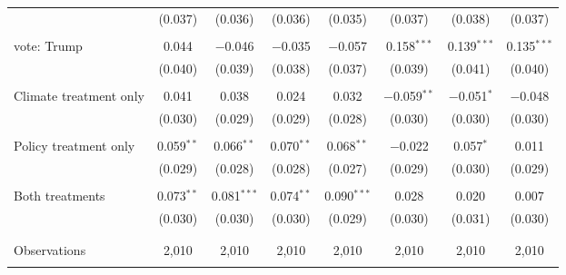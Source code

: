 \begin{tabular}{@{\extracolsep{5pt}}lccccccc}
  & (0.037) & (0.036) & (0.036) & (0.035) & (0.037) & (0.038) & (0.037) \\ 
  & & & & & & & \\ 
 vote: Trump & 0.044 & $-$0.046 & $-$0.035 & $-$0.057 & 0.158$^{***}$ & 0.139$^{***}$ & 0.135$^{***}$ \\ 
  & (0.040) & (0.039) & (0.038) & (0.037) & (0.039) & (0.041) & (0.040) \\ 
  & & & & & & & \\ 
 Climate treatment only & 0.041 & 0.038 & 0.024 & 0.032 & $-$0.059$^{**}$ & $-$0.051$^{*}$ & $-$0.048 \\ 
  & (0.030) & (0.029) & (0.029) & (0.028) & (0.030) & (0.030) & (0.030) \\ 
  & & & & & & & \\ 
 Policy treatment only & 0.059$^{**}$ & 0.066$^{**}$ & 0.070$^{**}$ & 0.068$^{**}$ & $-$0.022 & 0.057$^{*}$ & 0.011 \\ 
  & (0.029) & (0.028) & (0.028) & (0.027) & (0.029) & (0.030) & (0.029) \\ 
  & & & & & & & \\ 
 Both treatments & 0.073$^{**}$ & 0.081$^{***}$ & 0.074$^{**}$ & 0.090$^{***}$ & 0.028 & 0.020 & 0.007 \\ 
  & (0.030) & (0.030) & (0.030) & (0.029) & (0.030) & (0.031) & (0.030) \\ 
  & & & & & & & \\ 
\hline \\[-1.8ex] 

Observations & 2,010 & 2,010 & 2,010 & 2,010 & 2,010 & 2,010 & 2,010 \\ 
\hline 
\hline \\[-1.8ex] 
\end{tabular} 